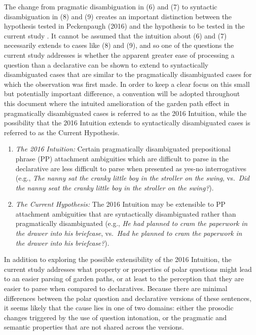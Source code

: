 \documentclass[11pt,oneside]{book}
\begin{document}
The change from pragmatic disambiguation in (6) and (7) to syntactic disambiguation in (8) and (9) creates an important distinction between the hypothesis tested in Peckenpaugh (2016) and the hypothesis to be tested in the current study . It cannot be assumed that the intuition about (6) and (7) necessarily extends to cases like (8) and (9), and so one of the questions the current study addresses is whether the apparent greater ease of processing a question than a declarative can be shown to extend to syntactically disambiguated cases that are similar to the pragmatically disambiguated cases for which the observation was first made. In order to keep a clear focus on this small but potentially important difference, a convention will be adopted throughout this document where the intuited amelioration of the garden path effect in pragmatically disambiguated cases is referred to as the 2016 Intuition, while the possibility that the 2016 Intuition extends to syntactically disambiguated cases is referred to as the Current Hypothesis.

\begin{enumerate}
\def\labelenumi{(\arabic{enumi})}
\setcounter{enumi}{9}
\item
  \emph{The 2016 Intuition:} Certain pragmatically disambiguated prepositional phrase (PP) attachment ambiguities which are difficult to parse in the declarative are less difficult to parse when presented as yes-no interrogatives (e.g., \emph{The nanny sat the cranky little boy in the stroller on the swing}, vs.~\emph{Did the nanny seat the cranky little boy in the stroller on the swing?}).
\item
  \emph{The Current Hypothesis:} The 2016 Intuition may be extensible to PP attachment ambiguities that are syntactically disambiguated rather than pragmatically disambiguated (e.g., \emph{He had planned to cram the paperwork in the drawer into his briefcase}, vs.~\emph{Had he planned to cram the paperwork in the drawer into his briefcase?}).
\end{enumerate}

In addition to exploring the possible extensibility of the 2016 Intuition, the current study addresses what property or properties of polar questions might lead to an easier parsing of garden paths, or at least to the perception that they are easier to parse when compared to declaratives. Because there are minimal differences between the polar question and declarative versions of these sentences, it seems likely that the cause lies in one of two domains: either the prosodic changes triggered by the use of question intonation, or the pragmatic and semantic properties that are not shared across the versions.
\end{document}

